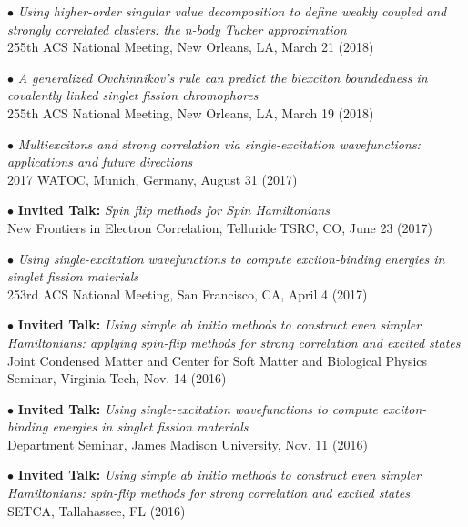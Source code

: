 \documentclass[10pt]{article}
\newenvironment{lonelist}[1][\enskip\textbullet]%
        {\vspace{-\baselineskip}\begin{list}{#1}{%
        \setlength{\partopsep}{0pt}%
        \setlength{\topsep}{0pt}}}
        {\end{list}\vspace{-.6\baselineskip}}
\begin{document}
\begin{lonelist}
\item[$\bullet$] \textit{Using higher-order singular value decomposition to define weakly coupled and strongly correlated clusters: the n-body Tucker approximation}\\
255th ACS National Meeting,  New Orleans, LA, March 21 (2018)

\item[$\bullet$] \textit{A generalized Ovchinnikov's rule can predict the biexciton boundedness in covalently linked singlet fission chromophores}\\
255th ACS National Meeting,  New Orleans, LA, March 19 (2018)

\item[$\bullet$] \textit{Multiexcitons and strong correlation via single-excitation wavefunctions: applications and future directions}\\
2017 WATOC, Munich, Germany,  August 31 (2017)

\item[$\bullet$] \textbf{Invited Talk:} \textit{Spin flip methods for Spin Hamiltonians}\\
New Frontiers in Electron Correlation, Telluride TSRC, CO,  June 23 (2017)

\item[$\bullet$] \textit{Using single-excitation wavefunctions to compute exciton-binding energies in singlet fission materials}\\
253rd ACS National Meeting, San Francisco, CA, April 4 (2017)

\item[$\bullet$] \textbf{Invited Talk:} \textit{Using simple ab initio methods to construct even simpler Hamiltonians: applying spin-flip methods for strong correlation and excited states}\\
Joint Condensed Matter and Center for Soft Matter and Biological Physics Seminar, Virginia Tech, Nov. 14 (2016)

\item[$\bullet$] \textbf{Invited Talk:} \textit{Using single-excitation wavefunctions to compute exciton-binding energies in singlet fission materials}\\
Department Seminar, James Madison University, Nov. 11 (2016)

\item[$\bullet$] \textbf{Invited Talk:} \textit{Using simple ab initio methods to construct even simpler Hamiltonians: spin-flip methods for strong correlation and excited states}\\
SETCA, Tallahassee, FL (2016)


\end{lonelist}
\end{document}
